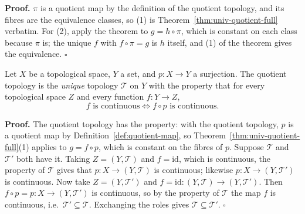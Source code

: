 \documentclass[11pt]{report}
\makeatletter
\newcounter{thmcounter}[section]
\renewenvironment{proof}[1][Proof]{\noindent\textbf{#1.} }{\hfill$\square$\par\vspace{5pt}}
\newcommand{\thmlabel}[1]{\edef\@currentlabel{\arabic{section}.\arabic{thmcounter}}\label{#1}}
\newcommand{\leeref}[1]{\par\smallskip{\raggedleft\footnotesize\textsc{Lee}:\ #1\par}}
\makeatother
\begin{document}
\begin{proof}
$\pi$ is a quotient map by the definition of the quotient topology, and its fibres are the equivalence classes, so (1) is Theorem~\ref{thm:univ-quotient-full} verbatim. For (2), apply the theorem to $g = h \circ \pi$, which is constant on each class because $\pi$ is; the unique $f$ with $f \circ \pi = g$ is $h$ itself, and (1) of the theorem gives the equivalence.
\end{proof}

\begin{corbox}\thmlabel{cor:univ-characterizes}
Let $X$ be a topological space, $Y$ a set, and $p : X \to Y$ a surjection. The quotient topology is the \emph{unique} topology $\mathcal{T}$ on $Y$ with the property that for every topological space $Z$ and every function $f : Y \to Z$,
\[
f \text{ is continuous} \iff f \circ p \text{ is continuous.}
\]
\leeref{Theorem A.27(b)}
\end{corbox}

\begin{proof}
The quotient topology has the property: with the quotient topology, $p$ is a quotient map by Definition~\ref{def:quotient-map}, so Theorem~\ref{thm:univ-quotient-full}(1) applies to $g = f \circ p$, which is constant on the fibres of $p$. Suppose $\mathcal{T}$ and $\mathcal{T}'$ both have it. Taking $Z = (Y,\mathcal{T})$ and $f = \mathrm{id}$, which is continuous, the property of $\mathcal{T}$ gives that $p : X \to (Y,\mathcal{T})$ is continuous; likewise $p : X \to (Y,\mathcal{T}')$ is continuous. Now take $Z = (Y,\mathcal{T}')$ and $f = \mathrm{id} : (Y,\mathcal{T}) \to (Y,\mathcal{T}')$. Then $f \circ p = p : X \to (Y,\mathcal{T}')$ is continuous, so by the property of $\mathcal{T}$ the map $f$ is continuous, i.e.\ $\mathcal{T}' \subseteq \mathcal{T}$. Exchanging the roles gives $\mathcal{T} \subseteq \mathcal{T}'$.
\end{proof}
\end{document}
